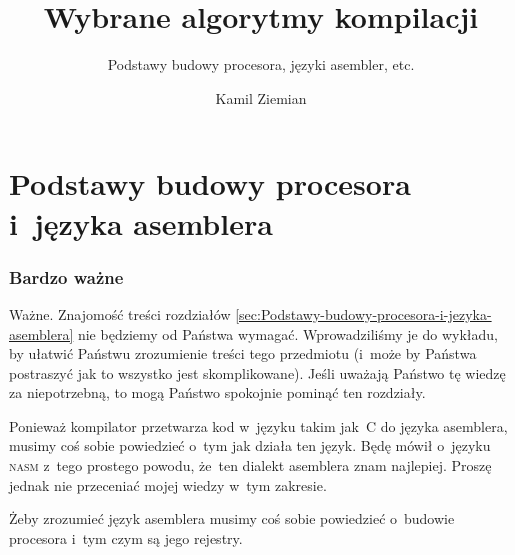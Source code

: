 \documentclass[10pt,t]{beamer}
\title{Wybrane algorytmy kompilacji}
\subtitle{Podstawy budowy procesora, języki asembler, etc.}
\author{Kamil Ziemian \\
  \email}
\begin{document}





\RaggedRight





\maketitle


















\section{Podstawy budowy procesora i~języka asemblera}

\label{sec:Podstawy-budowy-procesora-i-jezyka-asemblera}





\begin{frame}
  \frametitle{Bardzo ważne}


  \alert{Ważne.} Znajomość treści rozdziałów
  \eqref{sec:Podstawy-budowy-procesora-i-jezyka-asemblera} nie będziemy od
  Państwa wymagać. Wprowadziliśmy je do wykładu, by ułatwić Państwu
  zrozumienie treści tego przedmiotu (i~może by Państwa postraszyć jak to
  wszystko jest skomplikowane). Jeśli uważają Państwo tę wiedzę za
  niepotrzebną, to mogą Państwo spokojnie pominąć ten rozdziały.

  Ponieważ kompilator przetwarza kod w~języku takim jak~C do języka
  asemblera, musimy coś sobie powiedzieć o~tym jak działa ten język. Będę
  mówił o~języku \textsc{nasm} z~tego prostego powodu, że~ten dialekt
  asemblera znam najlepiej. Proszę jednak nie przeceniać mojej wiedzy w~tym
  zakresie.

  Żeby zrozumieć język asemblera musimy coś sobie powiedzieć o~budowie
  procesora i~tym czym są jego rejestry.

\end{frame}
\end{document}
